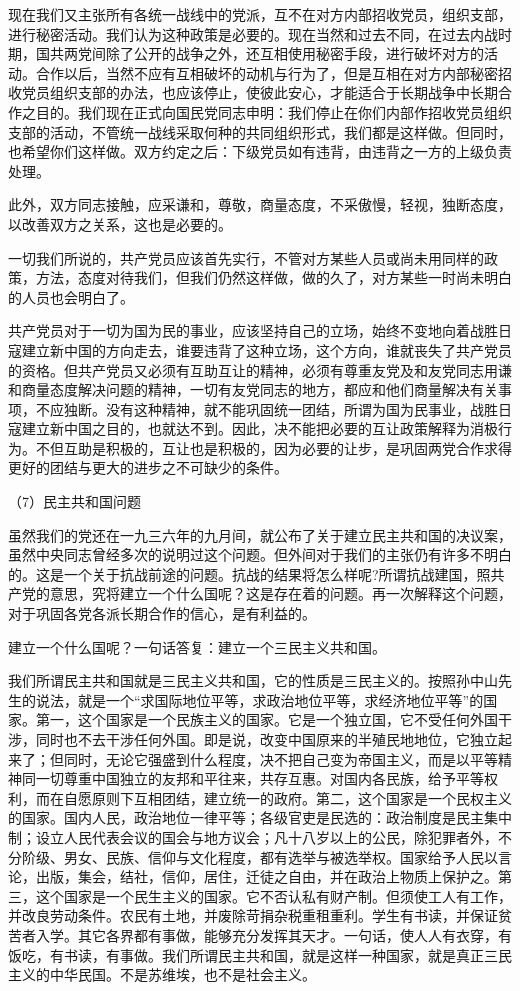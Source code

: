 \documentclass[UTF8, 12pt, a4paper]{ctexrep}
\begin{document}
现在我们又主张所有各统一战线中的党派，互不在对方内部招收党员，组织支部，进行秘密活动。我们认为这种政策是必要的。现在当然和过去不同，在过去内战时期，国共两党间除了公开的战争之外，还互相使用秘密手段，进行破坏对方的活动。合作以后，当然不应有互相破坏的动机与行为了，但是互相在对方内部秘密招收党员组织支部的办法，也应该停止，使彼此安心，才能适合于长期战争中长期合作之目的。我们现在正式向国民党同志申明：我们停止在你们内部作招收党员组织支部的活动，不管统一战线采取何种的共同组织形式，我们都是这样做。但同时，也希望你们这样做。双方约定之后：下级党员如有违背，由违背之一方的上级负责处理。

此外，双方同志接触，应采谦和，尊敬，商量态度，不采傲慢，轻视，独断态度，以改善双方之关系，这也是必要的。

一切我们所说的，共产党员应该首先实行，不管对方某些人员或尚未用同样的政策，方法，态度对待我们，但我们仍然这样做，做的久了，对方某些一时尚未明白的人员也会明白了。

共产党员对于一切为国为民的事业，应该坚持自己的立场，始终不变地向着战胜日寇建立新中国的方向走去，谁要违背了这种立场，这个方向，谁就丧失了共产党员的资格。但共产党员又必须有互助互让的精神，必须有尊重友党及和友党同志用谦和商量态度解决问题的精神，一切有友党同志的地方，都应和他们商量解决有关事项，不应独断。没有这种精神，就不能巩固统一团结，所谓为国为民事业，战胜日寇建立新中国之目的，也就达不到。因此，决不能把必要的互让政策解释为消极行为。不但互助是积极的，互让也是积极的，因为必要的让步，是巩固两党合作求得更好的团结与更大的进步之不可缺少的条件。

（7）民主共和国问题

虽然我们的党还在一九三六年的九月间，就公布了关于建立民主共和国的决议案，虽然中央同志曾经多次的说明过这个问题。但外间对于我们的主张仍有许多不明白的。这是一个关于抗战前途的问题。抗战的结果将怎么样呢?所谓抗战建国，照共产党的意思，究将建立一个什么国呢？这是存在着的问题。再一次解释这个问题，对于巩固各党各派长期合作的信心，是有利益的。

建立一个什么国呢？一句话答复：建立一个三民主义共和国。

我们所谓民主共和国就是三民主义共和国，它的性质是三民主义的。按照孙中山先生的说法，就是一个“求国际地位平等，求政治地位平等，求经济地位平等”的国家。第一，这个国家是一个民族主义的国家。它是一个独立国，它不受任何外国干涉，同时也不去干涉任何外国。即是说，改变中国原来的半殖民地地位，它独立起来了；但同时，无论它强盛到什么程度，决不把自己变为帝国主义，而是以平等精神同一切尊重中国独立的友邦和平往来，共存互惠。对国内各民族，给予平等权利，而在自愿原则下互相团结，建立统一的政府。第二，这个国家是一个民权主义的国家。国内人民，政治地位一律平等；各级官吏是民选的：政治制度是民主集中制；设立人民代表会议的国会与地方议会；凡十八岁以上的公民，除犯罪者外，不分阶级、男女、民族、信仰与文化程度，都有选举与被选举权。国家给予人民以言论，出版，集会，结社，信仰，居住，迁徒之自由，并在政治上物质上保护之。第三，这个国家是一个民生主义的国家。它不否认私有财产制。但须使工人有工作，并改良劳动条件。农民有土地，并废除苛捐杂税重租重利。学生有书读，并保证贫苦者入学。其它各界都有事做，能够充分发挥其天才。一句话，使人人有衣穿，有饭吃，有书读，有事做。我们所谓民主共和国，就是这样一种国家，就是真正三民主义的中华民国。不是苏维埃，也不是社会主义。
\end{document}
